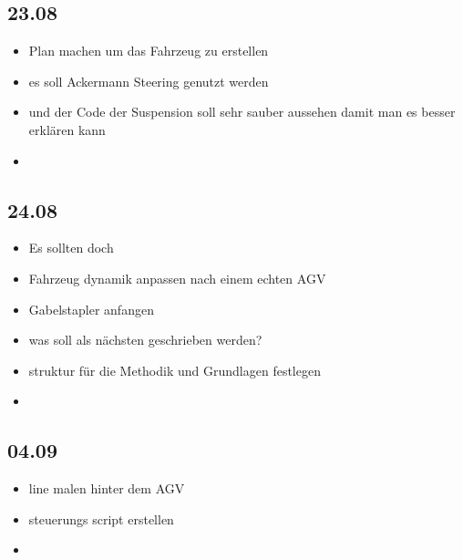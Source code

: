 \subsection{23.08}
\begin{itemize}
\item Plan machen um das Fahrzeug zu erstellen
\item es soll Ackermann Steering genutzt werden 
\item und der Code der Suspension soll sehr sauber aussehen damit man es besser erklären kann
\item 
\end{itemize}


\subsection{24.08}
\begin{itemize}
\item Es sollten doch 
\item Fahrzeug dynamik anpassen nach einem echten AGV
\item Gabelstapler anfangen 
\item was soll als nächsten geschrieben werden?
\item struktur für die Methodik und Grundlagen festlegen
\item 
\end{itemize}

\subsection{04.09}
\begin{itemize}
\item line malen hinter dem AGV
\item steuerungs script erstellen
\item
\end{itemize}
